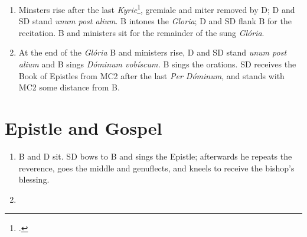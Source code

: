\documentclass[letterpaper]{article}
\begin{document}
\begin{enumerate}
    \item Minsters rise after the last \textit{Kyrie}\footcite[][227, p.
        241]{stehle}, gremiale and miter removed by D; D and SD stand
        \textit{unum post alium}. B intones the \textit{Gloria}; D and SD flank
        B for the recitation. B and ministers sit for the remainder of the sung
        \textit{Glória}.

    \item At the end of the \textit{Glória} B and ministers rise, D and SD
        stand \textit{unum post alium} and B sings \textit{Dóminum vobíscum.} B
        sings the orations. SD receives the Book of Epistles from MC2 after the
        last \textit{Per Dóminum}, and stands with MC2 some distance from B.

\end{enumerate}

\section{Epistle and Gospel}

\begin{enumerate}

    \item B and D sit. SD bows to B and sings the Epistle; afterwards he
        repeats the reverence, goes the middle and genuflects, and kneels to
        receive the bishop's blessing.

    \item 

\end{enumerate}

%
\printbibliography
    
\end{document}
